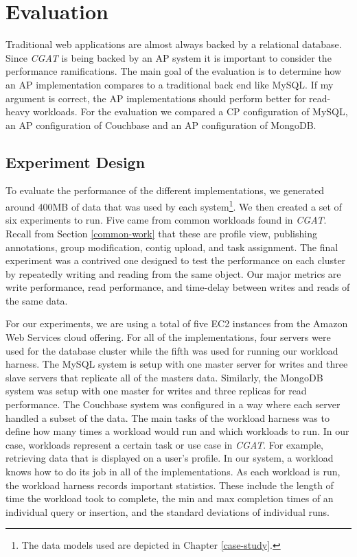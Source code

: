 \documentclass[12pt]{ucthesis}
\begin{document}
\chapter{Evaluation}
\label{evaluation}

Traditional web applications are almost always backed by a relational database.
Since \textit{CGAT} is being backed by an AP system it is important to consider the performance ramifications.
The main goal of the evaluation is to determine how an AP implementation compares to a traditional back end like MySQL. If my argument is correct, the AP implementations should perform better for read-heavy workloads. For the evaluation we compared a CP configuration of MySQL, an AP configuration of Couchbase and an AP configuration of MongoDB.


\section{Experiment Design}\label{sec:design}
To evaluate the performance of the different implementations, we generated around 400MB
of data that was used by each system\footnote{The data models used are depicted in Chapter \ref{case-study}.}.
We then created a set of six experiments to run. Five came from common workloads
found in \textit{CGAT}. Recall from Section \ref{common-work} that these are
profile view, publishing annotations, group modification, contig upload, and task assignment.
The final experiment was a contrived one designed to test the performance on each cluster by repeatedly writing and
reading from the same object. Our major metrics are write performance, read
performance, and time-delay between writes and reads of the same data.

For our experiments, we are using a total of five EC2 instances from the Amazon
Web Services cloud offering. For all of the implementations, four servers were used
for the database cluster while the fifth was used for running our workload harness.
The MySQL system is setup with one master server for writes and three
slave servers that replicate all of the masters data. Similarly, the MongoDB system
was setup with one master for writes and three replicas for read performance. 
The Couchbase
system was configured in a way where each server handled a subset of the data. The main tasks of the
workload harness was to define how many times a workload would run and which
workloads to run. In our case, workloads represent a certain task or use case
in \textit{CGAT}. For example, retrieving data that is displayed on
a user's profile. In our system, a workload knows how to do its job in all of the implementations.
As each workload is run, the workload harness
records important statistics. These include the length of time the workload
took to complete, the min and max completion times of an individual query or
insertion, and the standard deviations of individual runs.
\end{document}
